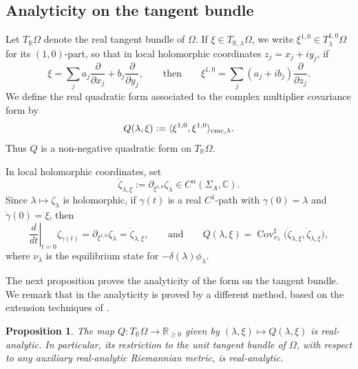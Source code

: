 \documentclass[11pt]{amsart}
\theoremstyle{plain}
\newtheorem{prop}[thm]{Proposition}
\theoremstyle{definition}
\theoremstyle{remark}
\begin{document}
\subsection{Analyticity on the tangent bundle}
Let $T_{\mathbb R}\Omega$ denote the real tangent bundle of $\Omega$. If
$\xi\in T_{\mathbb R,\lambda}\Omega$, we write
$\xi^{1,0}\in T^{1,0}_\lambda\Omega$
for its $(1,0)$-part,
 so that in local holomorphic coordinates
\(z_j=x_j+iy_j\), if
\[
\xi=\sum_j a_j\frac{\partial}{\partial x_j}
    +b_j\frac{\partial}{\partial y_j},
\qquad
\text{then}
\qquad
\xi^{1,0}=\sum_j(a_j+ib_j)\frac{\partial}{\partial z_j}.
\]
We define the real quadratic form associated to the
complex multiplier covariance form by
$$
Q(\lambda,\xi) :=
\langle \xi^{1,0},\xi^{1,0}\rangle_{\rm cmc,\lambda}.
$$
Thus $Q$ is a non-negative quadratic form on $T_{\mathbb R}\Omega$.

In local holomorphic coordinates, set
$$
\dot\zeta_{\lambda,\xi} :=
\partial_{\xi^{1,0}}\zeta_\lambda \in C^\alpha(\Sigma_A,\mathbb C).
$$
Since $\lambda\mapsto\zeta_\lambda$ is holomorphic, if
$\gamma(t)$ is a real $C^1$-path with
$\gamma(0)=\lambda$
and $\dot\gamma(0)=\xi$,
then
$$
\left.\frac{d}{dt}\right|_{t=0}\zeta_{\gamma(t)}
=\partial_{\xi^{1,0}}\zeta_\lambda
=\dot\zeta_{\lambda,\xi},   
\qquad
\text{and}
\qquad
Q(\lambda,\xi) =
\operatorname{Cov}^{\sharp}_{\nu_\lambda}\bigl(\dot\zeta_{\lambda,\xi}, \dot\zeta_{\lambda,\xi}\bigr),
$$
where $\nu_\lambda$ is the equilibrium state for
$-\delta(\lambda)\phi_\lambda$.


The next proposition proves the analyticity of the form on the tangent bundle. 
We remark that 
in \cite{BH24,BH25}
the analyticity is proved by a different
method, based on the extension techniques of 
\cite{SU10,UZ04real}.

\begin{prop}\label{prop:analyticity-tangent-bundle}
The map
$Q\colon T_{\mathbb R}\Omega\to \mathbb R_{\ge 0}$ given by
$(\lambda,\xi)\mapsto Q(\lambda,\xi)$
is real-analytic. In particular, its restriction to the unit tangent bundle of
$\Omega$, with respect to any auxiliary real-analytic Riemannian metric, is
real-analytic.
\end{prop}
\end{document}
